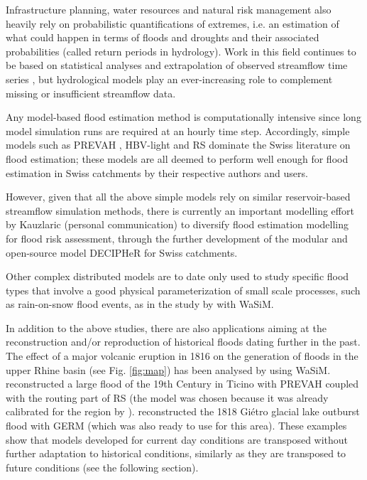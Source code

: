 \documentclass[10pt,a4paper]{article}
\begin{document}
Infrastructure planning, water resources and natural risk management
also heavily rely on probabilistic quantifications of extremes, i.e. an
estimation of what could happen in terms of floods and droughts and
their associated probabilities (called return periods in hydrology).
Work in this field continues to be based on statistical analyses and
extrapolation of observed streamflow time series \citep{Brunner2018,Asadi20108}, but
hydrological models play an ever-increasing role to complement missing
or insufficient streamflow data.

Any model-based flood estimation method is computationally intensive
since long model simulation runs are required at an hourly time step.
Accordingly, simple models such as PREVAH \citep{Viviroli_2009,Viviroli2009c,Felder2017},
HBV-light \citep{Brunner_2019a,Sikorska2017,Sikorska-Senoner2020} and 
RS \citep{Zeimetz2018,Zeimetz2017,Bieri2013} dominate the
Swiss literature on flood estimation; these models are all deemed to
perform well enough for flood estimation in Swiss catchments by their
respective authors and users. 

However, given that all the above simple models rely on similar
reservoir-based streamflow simulation methods, there is currently an
important modelling effort by Kauzlaric (personal communication) to
diversify flood estimation modelling for flood risk assessment, through
the further development of the modular and open-source model DECIPHeR
for Swiss catchments.

Other complex distributed models are to date only used to study specific
flood types that involve a good physical parameterization of small scale
processes, such as rain-on-snow flood events, as in the study
by \citet{Rossler2014} with WaSiM. 

In addition to the above studies, there are also applications aiming at
the reconstruction and/or reproduction of historical floods dating
further in the past. The effect of a major volcanic eruption in 1816 on
the generation of floods in the upper Rhine basin (see
Fig. \ref{fig:map}) has been analysed
by \citet{Rossler2018} using WaSiM. \citet{Stucki2018} reconstructed
a large flood of the 19th Century in Ticino with PREVAH coupled with the
routing part of RS (the model was chosen because it was already
calibrated for the region
by \citet{Andres_2016}). \citet{Ancey2019} reconstructed the 1818
Giétro glacial lake outburst flood with GERM (which was also ready to
use for this area). These examples show that models developed for
current day conditions are transposed without further adaptation to
historical conditions, similarly as they are transposed to future
conditions (see the following section).
\end{document}
